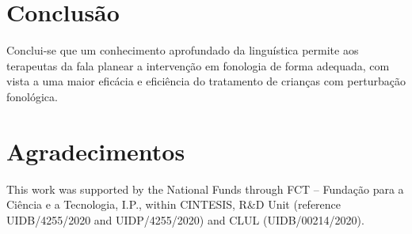 \documentclass[output=paper,colorlinks,citecolor=brown,booklanguage=portuguese]{langscibook}
\begin{document}
\section{Conclusão}
Conclui-se que um conhecimento aprofundado da linguística permite  aos te\-rapeutas da fala planear a intervenção em fonologia de forma adequada, com vista a uma maior eficácia e eficiência do tratamento de crianças com perturbação fonológica. 

\section*{Agradecimentos}
This work was supported by the National Funds through FCT – Fundação para a Ciência e a Tecnologia, I.P., within CINTESIS, R\&D Unit (reference UIDB/4255{\slash}2020 and UIDP/4255/2020) and CLUL (UIDB/00214/2020).

{\sloppy\printbibliography[heading=subbibliography,notkeyword=this]}
\end{document}

